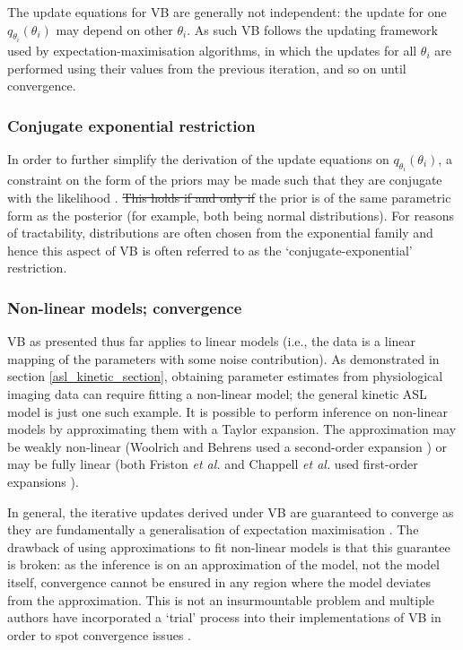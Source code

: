 \documentclass[12pt]{report}
\providecommand{\DIFaddtex}[1]{{\protect\color{blue}\uwave{#1}}} %
\providecommand{\DIFdeltex}[1]{{\protect\color{red}\sout{#1}}}                      %
\providecommand{\DIFaddbegin}{} %
\providecommand{\DIFaddend}{} %
\providecommand{\DIFdelbegin}{} %
\providecommand{\DIFdelend}{} %
\providecommand{\DIFadd}[1]{\texorpdfstring{\DIFaddtex{#1}}{#1}} %
\providecommand{\DIFdel}[1]{\texorpdfstring{\DIFdeltex{#1}}{}} %
\newcommand{\DIFscaledelfig}{0.5}
\newlength{\DIFdelgraphicswidth} %
\newlength{\DIFdelgraphicsheight} %
\newcommand{\DIFaddincludegraphics}[2][]{{\color{blue}\fbox{\DIFOincludegraphics[#1]{#2}}}} %
\newcommand{\DIFdelincludegraphics}[2][]{%
\sbox{\DIFdelgraphicsbox}{\DIFOincludegraphics[#1]{#2}}%
\settoboxwidth{\DIFdelgraphicswidth}{\DIFdelgraphicsbox} %
\settoboxtotalheight{\DIFdelgraphicsheight}{\DIFdelgraphicsbox} %
\scalebox{\DIFscaledelfig}{%
\parbox[b]{\DIFdelgraphicswidth}{\usebox{\DIFdelgraphicsbox}\\[-\baselineskip] \rule{\DIFdelgraphicswidth}{0em}}\llap{\resizebox{\DIFdelgraphicswidth}{\DIFdelgraphicsheight}{%
\setlength{\unitlength}{\DIFdelgraphicswidth}%
\begin{picture}(1,1)%
\thicklines\linethickness{2pt} %
{\color[rgb]{1,0,0}\put(0,0){\framebox(1,1){}}}%
{\color[rgb]{1,0,0}\put(0,0){\line( 1,1){1}}}%
{\color[rgb]{1,0,0}\put(0,1){\line(1,-1){1}}}%
\end{picture}%
}\hspace*{3pt}}} %
} %
\DeclareRobustCommand{\DIFaddbegin}{\DIFOaddbegin \let\includegraphics\DIFaddincludegraphics} %
\DeclareRobustCommand{\DIFaddend}{\DIFOaddend \let\includegraphics\DIFOincludegraphics} %
\DeclareRobustCommand{\DIFdelbegin}{\DIFOdelbegin \let\includegraphics\DIFdelincludegraphics} %
\DeclareRobustCommand{\DIFdelend}{\DIFOaddend \let\includegraphics\DIFOincludegraphics} %
\begin{document}
The update equations for VB are generally not independent: the update for one $q_{\theta_i}(\theta_i)$ may depend on other $\theta_i$. As such VB follows the updating framework used by expectation-maximisation algorithms, in which the updates for all $\theta_i$ are performed using their values from the previous iteration, and so on until convergence.

\subsubsection{Conjugate exponential restriction}

In order to further simplify the derivation of the update equations on $q_{\theta_i}(\theta_i)$, a constraint on the form of the priors may be made such that they are conjugate with the likelihood \cite{Chappell2009}. \DIFdelbegin \DIFdel{This holds if and only if }\DIFdelend \DIFaddbegin \DIFadd{In this context, conjugacy means that }\DIFaddend the prior is of the same parametric form as the posterior (for example, both being normal distributions). For reasons of tractability, distributions are often chosen from the exponential family and hence this aspect of VB is often referred to as the `conjugate-exponential' restriction. 

\subsubsection{Non-linear models; convergence}

VB as presented thus far applies to linear models (i.e., the data is a linear mapping of the parameters with some noise contribution). As demonstrated in section \ref{asl_kinetic_section}, obtaining parameter estimates from physiological imaging data can require fitting a non-linear model; the general kinetic ASL model is just one such example. It is possible to perform inference on non-linear models by approximating them with a Taylor expansion. The approximation may be weakly non-linear (Woolrich and Behrens used a second-order expansion \cite{Woolrich2006}) or may be fully linear (both Friston \textit{et al.} and Chappell \textit{et al.} used first-order expansions \cite{Chappell2009, Friston2007}). 

In general, the iterative updates derived under VB are guaranteed to converge as they are fundamentally a generalisation of expectation maximisation \cite{Attias2000}. The drawback of using approximations to fit non-linear models is that this guarantee is broken: as the inference is on an approximation of the model, not the model itself, convergence cannot be ensured in any region where the model deviates from the approximation. This is not an insurmountable problem and multiple authors have incorporated a `trial' process into their implementations of VB in order to spot convergence issues \cite{Chappell2009, Friston2007}. 
\end{document}
